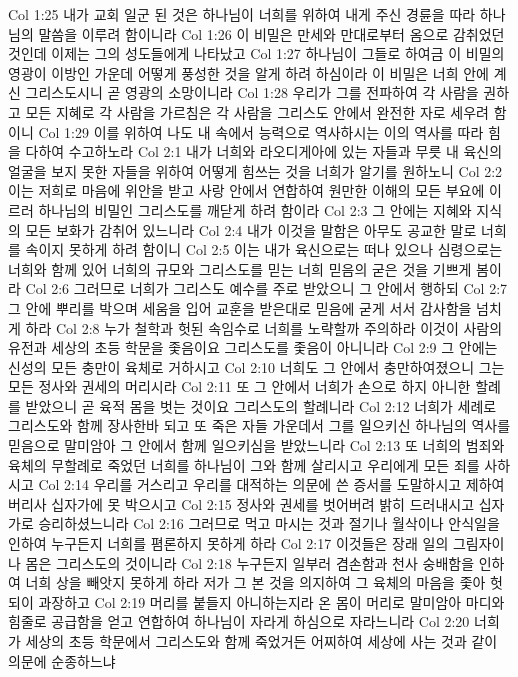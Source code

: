 Col 1:25  내가 교회 일군 된 것은 하나님이 너희를 위하여 내게 주신 경륜을 따라 하나님의 말씀을 이루려 함이니라
Col 1:26  이 비밀은 만세와 만대로부터 옴으로 감취었던 것인데 이제는 그의 성도들에게 나타났고
Col 1:27  하나님이 그들로 하여금 이 비밀의 영광이 이방인 가운데 어떻게 풍성한 것을 알게 하려 하심이라 이 비밀은 너희 안에 계신 그리스도시니 곧 영광의 소망이니라
Col 1:28  우리가 그를 전파하여 각 사람을 권하고 모든 지혜로 각 사람을 가르침은 각 사람을 그리스도 안에서 완전한 자로 세우려 함이니
Col 1:29  이를 위하여 나도 내 속에서 능력으로 역사하시는 이의 역사를 따라 힘을 다하여 수고하노라
Col 2:1  내가 너희와 라오디게아에 있는 자들과 무릇 내 육신의 얼굴을 보지 못한 자들을 위하여 어떻게 힘쓰는 것을 너희가 알기를 원하노니
Col 2:2  이는 저희로 마음에 위안을 받고 사랑 안에서 연합하여 원만한 이해의 모든 부요에 이르러 하나님의 비밀인 그리스도를 깨닫게 하려 함이라
Col 2:3  그 안에는 지혜와 지식의 모든 보화가 감취어 있느니라
Col 2:4  내가 이것을 말함은 아무도 공교한 말로 너희를 속이지 못하게 하려 함이니
Col 2:5  이는 내가 육신으로는 떠나 있으나 심령으로는 너희와 함께 있어 너희의 규모와 그리스도를 믿는 너희 믿음의 굳은 것을 기쁘게 봄이라
Col 2:6  그러므로 너희가 그리스도 예수를 주로 받았으니 그 안에서 행하되
Col 2:7  그 안에 뿌리를 박으며 세움을 입어 교훈을 받은대로 믿음에 굳게 서서 감사함을 넘치게 하라
Col 2:8  누가 철학과 헛된 속임수로 너희를 노략할까 주의하라 이것이 사람의 유전과 세상의 초등 학문을 좇음이요 그리스도를 좇음이 아니니라
Col 2:9  그 안에는 신성의 모든 충만이 육체로 거하시고
Col 2:10  너희도 그 안에서 충만하여졌으니 그는 모든 정사와 권세의 머리시라
Col 2:11  또 그 안에서 너희가 손으로 하지 아니한 할례를 받았으니 곧 육적 몸을 벗는 것이요 그리스도의 할례니라
Col 2:12  너희가 세례로 그리스도와 함께 장사한바 되고 또 죽은 자들 가운데서 그를 일으키신 하나님의 역사를 믿음으로 말미암아 그 안에서 함께 일으키심을 받았느니라
Col 2:13  또 너희의 범죄와 육체의 무할례로 죽었던 너희를 하나님이 그와 함께 살리시고 우리에게 모든 죄를 사하시고
Col 2:14  우리를 거스리고 우리를 대적하는 의문에 쓴 증서를 도말하시고 제하여 버리사 십자가에 못 박으시고
Col 2:15  정사와 권세를 벗어버려 밝히 드러내시고 십자가로 승리하셨느니라
Col 2:16  그러므로 먹고 마시는 것과 절기나 월삭이나 안식일을 인하여 누구든지 너희를 폄론하지 못하게 하라
Col 2:17  이것들은 장래 일의 그림자이나 몸은 그리스도의 것이니라
Col 2:18  누구든지 일부러 겸손함과 천사 숭배함을 인하여 너희 상을 빼앗지 못하게 하라 저가 그 본 것을 의지하여 그 육체의 마음을 좇아 헛되이 과장하고
Col 2:19  머리를 붙들지 아니하는지라 온 몸이 머리로 말미암아 마디와 힘줄로 공급함을 얻고 연합하여 하나님이 자라게 하심으로 자라느니라
Col 2:20  너희가 세상의 초등 학문에서 그리스도와 함께 죽었거든 어찌하여 세상에 사는 것과 같이 의문에 순종하느냐
